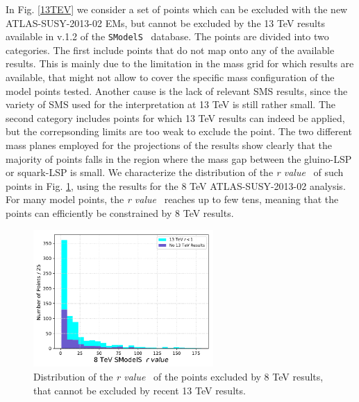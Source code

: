 \documentclass[a4paper,11pt]{article}
\newcommand{\SMO}{\texttt{SModelS\xspace}}
\newcommand{\RVALUE}{\textit{r value}}
\begin{document}
%
%
In Fig. \ref{13TEV} we consider a set of points which can be excluded with the new ATLAS-SUSY-2013-02 EMs, but cannot be excluded by the 13 TeV results available in v.1.2 of the \SMO~ database. The points are divided into two categories. The first include points that do not map onto any of the available results. This is mainly due to the limitation in the mass grid for which results are available, that might not allow to cover the specific mass configuration of the model points tested. Another cause is the lack of relevant SMS results, since the variety of SMS used for the interpretation at 13 TeV is still rather small. The second category includes points for which 13 TeV results can indeed be applied, but the correpsonding limits are too weak to exclude the point. 
The two different mass planes employed for the projections of the results show clearly that the majority of points falls in the region where the mass gap between the gluino-LSP or squark-LSP is small. We characterize the distribution of the \RVALUE~ of such points in Fig. \ref{13TeVrvalue}, using the results for the 8 TeV ATLAS-SUSY-2013-02 analysis. For many model points, the \RVALUE~ reaches up to few tens, meaning that the points can efficiently be constrained by 8 TeV results. 
%
\begin{figure} 
	\begin{center}
		\includegraphics[width=0.61\textwidth]{PLOTS/13TeV/rvalues.pdf}
	\end{center}
	\caption{Distribution of the \RVALUE~ of the points excluded by 8 TeV results, that cannot be excluded by recent 13 TeV results.} 
	\label{13TeVrvalue}
\end{figure}
\end{document}

